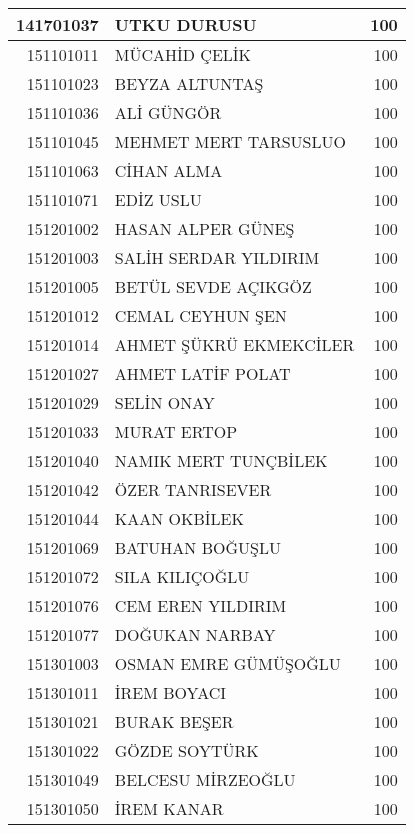 \documentclass[12pt]{article}
\begin{document}
\begin{longtable}{||r||l||r||}
    \midrule
    141701037 & UTKU DURUSU & 100 \\
    \midrule
    151101011 & MÜCAHİD ÇELİK & 100 \\
    \midrule
    151101023 & BEYZA ALTUNTAŞ & 100 \\
    \midrule
    151101036 & ALİ GÜNGÖR & 100 \\
    \midrule
    151101045 & MEHMET MERT TARSUSLUO & 100 \\
    \midrule
    151101063 & CİHAN ALMA & 100 \\
    \midrule
    151101071 & EDİZ USLU & 100 \\
    \midrule
    151201002 & HASAN ALPER GÜNEŞ & 100 \\
    \midrule
    151201003 & SALİH SERDAR YILDIRIM & 100 \\
    \midrule
    151201005 & BETÜL SEVDE AÇIKGÖZ & 100 \\
    \midrule
    151201012 & CEMAL CEYHUN ŞEN & 100 \\
    \midrule
    151201014 & AHMET ŞÜKRÜ EKMEKCİLER & 100 \\
    \midrule
    151201027 & AHMET LATİF POLAT & 100 \\
    \midrule
    151201029 & SELİN ONAY & 100 \\
    \midrule
    151201033 & MURAT ERTOP & 100 \\
    \midrule
    151201040 & NAMIK MERT TUNÇBİLEK & 100 \\
    \midrule
    151201042 & ÖZER TANRISEVER & 100 \\
    \midrule
    151201044 & KAAN OKBİLEK & 100 \\
    \midrule
    151201069 & BATUHAN BOĞUŞLU & 100 \\
    \midrule
    151201072 & SILA KILIÇOĞLU & 100 \\
    \midrule
    151201076 & CEM EREN YILDIRIM & 100 \\
    \midrule
    151201077 & DOĞUKAN NARBAY & 100 \\
    \midrule
    151301003 & OSMAN EMRE GÜMÜŞOĞLU & 100 \\
    \midrule
    151301011 & İREM BOYACI & 100 \\
    \midrule
    151301021 & BURAK BEŞER & 100 \\
    \midrule
    151301022 & GÖZDE SOYTÜRK & 100 \\
    \midrule
    151301049 & BELCESU MİRZEOĞLU & 100 \\
    \midrule
    151301050 & İREM KANAR & 100 \\

\end{longtable}
\end{document}
